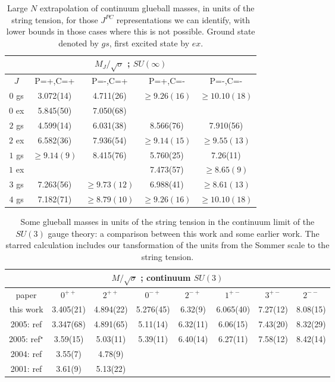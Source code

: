 \documentclass[12pt]{article}
\begin{document}
\begin{table}[htb]
\centering
\begin{tabular}{|c|c|c|c|c|} \hline
\multicolumn{5}{|c|}{$M_J/\surd\sigma$ ; $SU(\infty)$} \\ \hline
  $J$      & P=+,C=+   & P=-,C=+   &  P=+,C=-   &  P=-,C=-   \\ \hline
 $0$ {gs}  & 3.072(14) & 4.711(26) &  $\ge 9.26(16)$     & $\ge 10.10(18)$    \\ 
 $0$ {ex}  & 5.845(50) & 7.050(68) &                     &    \\ 
 $2$ {gs}  & 4.599(14) & 6.031(38) & 8.566(76)           &  7.910(56)  \\ 
 $2$ {ex}  & 6.582(36) & 7.936(54) &  $\ge 9.14(15)$     & $\ge 9.55(13)$    \\ 
 $1$ {gs}  & $\ge 9.14(9)$ & 8.415(76)  & 5.760(25)      & 7.26(11)   \\ 
 $1$ {ex}  &           &                & 7.473(57)      & $\ge 8.65(9) $  \\ 
 $3$ {gs}  & 7.263(56) & $\ge 9.73(12)$ & 6.988(41)      & $\ge 8.61(13) $   \\ 
 $4$ {gs}  & 7.182(71) & $\ge 8.79(10)$ & $\ge 9.26(16)$ & $\ge 10.10(18)$   \\  \hline
\end{tabular}
\caption{Large $N$ extrapolation of continuum glueball masses, in units of the string tension,
  for those $J^{PC}$ representations we can identify, with lower bounds in those
  cases where this is not possible. Ground state denoted by $gs$,
  first excited state by $ex$.}
\label{table_MK_J_SUN}
\end{table}


\begin{table}[htb]
\centering
\begin{tabular}{|c|c|c|c|c|c|c|c|} \hline
\multicolumn{8}{|c|}{$M/\surd\sigma$ ; continuum $SU(3)$} \\ \hline
  paper     & $0^{++}$ & $2^{++}$ & $0^{-+}$ & $2^{-+}$ & $1^{+-}$ & $3^{+-}$ & $2^{--}$    \\ \hline
 this work                      & 3.405(21)  & 4.894(22) &  5.276(45) & 6.32(9)  & 6.065(40) & 7.27(12) & 8.08(15)  \\
 2005: ref\cite{HM_Thesis}      & 3.347(68)  & 4.891(65) &  5.11(14)  & 6.32(11) & 6.06(15)  & 7.43(20) & 8.32(29)  \\
 2005: ref\cite{MP-2005}$^\star$ & 3.59(15)   & 5.03(11)  &  5.39(11) &  6.40(14) & 6.27(11)  & 7.58(12) & 8.42(14)  \\
 2004: ref\cite{BLMTUW_N}       & 3.55(7)    & 4.78(9)   &  &  &  &   &   \\
 2001: ref\cite{BLMT_N}         & 3.61(9)    & 5.13(22)  &  &  &  &   &   \\  \hline
\end{tabular}
\caption{Some glueball masses in units of the string tension in the continuum limit of the $SU(3)$ gauge theory:
  a comparison between this work and some earlier work. The starred calculation includes our tansformation of
the units from the Sommer scale to the string tension.}
\label{table_MK_J_SU3_comp}
\end{table}
\end{document}
